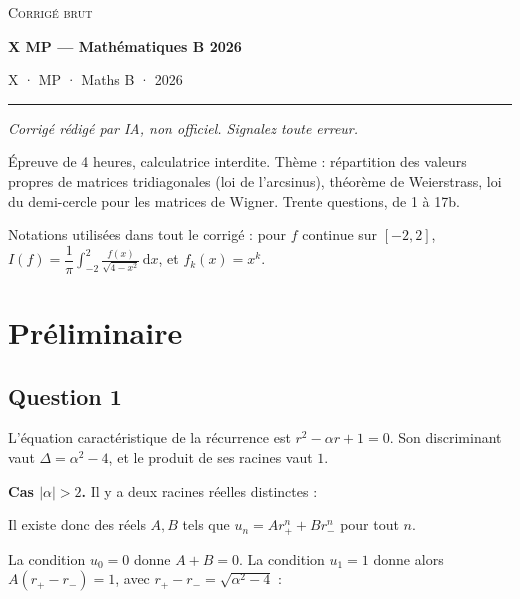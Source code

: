 \documentclass[11pt,a4paper]{article}
\newcommand{\equationajustee}[1]{%
  \sbox{\boiteequation}{$\displaystyle #1$}%
  \ifdim\wd\boiteequation>\linewidth
    \[\resizebox{\linewidth}{!}{\usebox{\boiteequation}}\]%
  \else
    \[#1\]%
  \fi}
\begin{document}
\thispagestyle{plain}
\begin{center}
  {\small\scshape Corrigé brut}\par\smallskip
  {\LARGE\bfseries X MP — Mathématiques B 2026\par}\medskip
  {\large X · MP · Maths B · 2026\par}
\end{center}
\vspace{2pt}\hrule\vspace{8pt}

\emph{Corrigé rédigé par IA, non officiel. Signalez toute erreur.}

Épreuve de 4 heures, calculatrice interdite. Thème : répartition des valeurs propres de matrices tridiagonales (loi de l'arcsinus), théorème de Weierstrass, loi du demi-cercle pour les matrices de Wigner. Trente questions, de 1 à 17b.

Notations utilisées dans tout le corrigé : pour \(f\) continue sur \([-2,2]\), \(I(f)=\dfrac1\pi\displaystyle\int_{-2}^2\frac{f(x)}{\sqrt{4-x^2}}\,\mathrm dx\), et \(f_k(x)=x^k\).

\hypertarget{pruxe9liminaire}{%
\section{Préliminaire}\label{pruxe9liminaire}}

\hypertarget{question-1}{%
\subsection{Question 1}\label{question-1}}

L'équation caractéristique de la récurrence est \(r^2-\alpha r+1=0\). Son discriminant vaut \(\Delta=\alpha^2-4\), et le produit de ses racines vaut \(1\).

\textbf{Cas \(|\alpha|>2\).} Il y a deux racines réelles distinctes :

\equationajustee{r_\pm=\frac{\alpha\pm\sqrt{\alpha^2-4}}2.}

Il existe donc des réels \(A,B\) tels que \(u_n=Ar_+^n+Br_-^n\) pour tout \(n\).

La condition \(u_0=0\) donne \(A+B=0\). La condition \(u_1=1\) donne alors \(A(r_+-r_-)=1\), avec \(r_+-r_-=\sqrt{\alpha^2-4}\) :

\equationajustee{\boxed{u_n=\frac{1}{\sqrt{\alpha^2-4}}\left[\left(\frac{\alpha+\sqrt{\alpha^2-4}}2\right)^n-\left(\frac{\alpha-\sqrt{\alpha^2-4}}2\right)^n\right]}}
\end{document}
